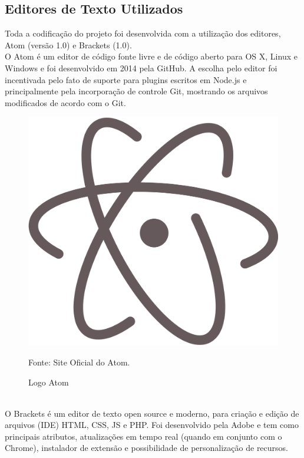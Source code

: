 \subsection{Editores de Texto Utilizados}	
	Toda a codificação do projeto foi desenvolvida com a utilização dos editores, Atom (versão 1.0) e Brackets (1.0).
\\
\indent
O Atom é um editor de código fonte livre e de código aberto para OS X, Linux e Windows e foi desenvolvido em 2014 pela GitHub. A escolha pelo editor foi incentivada pelo fato de suporte para plugins escritos em Node.js e principalmente pela incorporação de controle Git, mostrando os arquivos modificados de acordo com o Git.
\begin{figure}[!htb]
	\centering
	\includegraphics[scale=0.05
	]{imagens/atom_logo}
	\caption{Logo Atom}
	Fonte: Site Oficial do Atom.
	\label{Rotulo}
\end{figure}
\\
\indent
O Brackets é um editor de texto open source e moderno, para criação e edição de arquivos (IDE) HTML, CSS, JS e PHP. Foi desenvolvido pela Adobe e tem como principais atributos, atualizações em tempo real (quando em conjunto com o Chrome), instalador de extensão e possibilidade de personalização de recursos.

